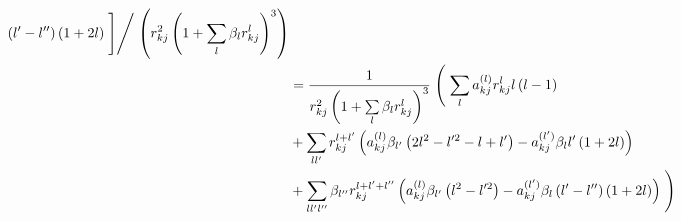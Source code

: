 \begin{align}
            \left(l'-l''\right) \left(1+2l\right) \Biggm] \Biggm/
            \left(r^2_{kj} \left(1 +
            \sum\limits_l\beta_lr^l_{kj}\right)^3\right) \nonumber \\
            &= \frac{1}{r^2_{kj} \left(1 +
            \sum\limits_l\beta_lr^l_{kj}\right)^3} \Biggm(\sum\limits_{l}a^{(l)}_{kj}
            r^l_{kj}l\left(l-1\right) \nonumber \\ &+ \sum\limits_{ll'}
            r^{l+l'}_{kj}\left(a^{(l)}_{kj}\beta_{l'}\left(2l^2-l'^2-l+l'\right) -
            a^{(l')}_{kj}\beta_ll'\left(1+2l\right)\right) \nonumber \\ &+
            \sum\limits_{ll'l''}\beta_{l''}r^{l+l'+l''}_{kj}
            \left(a^{(l)}_{kj}\beta_{l'}\left(l^2-l'^2\right) -
            a^{(l')}_{kj}\beta_l\left(l'-l''\right)\left(1+2l\right)\right)\Biggm)
        \end{align}
